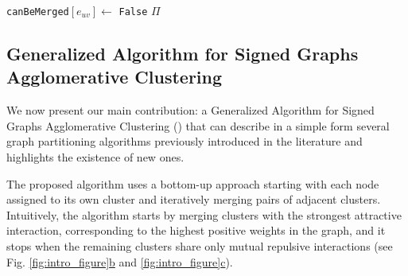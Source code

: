 \begin{algorithm}[t]
\begin{algorithmic}[1]
        \EndIf
          \State \texttt{canBeMerged}$[e_{uv}] \gets$ \texttt{False}
        \EndIf
      \EndWhile
      \State
      \Return $\Pi$



  \end{algorithmic}
  \label{main_alg}
\end{algorithm}


\subsection{Generalized Algorithm for Signed Graphs Agglomerative Clustering} \label{sec:algorithm}

We now present our main contribution: a Generalized Algorithm for Signed Graphs Agglomerative Clustering (\algname) that can describe in a simple form several graph partitioning algorithms previously introduced in the literature and highlights the existence of new ones.

The proposed algorithm uses a bottom-up approach starting with each node assigned to its own cluster and iteratively merging pairs of adjacent clusters. Intuitively, the algorithm starts by merging clusters with the strongest attractive interaction, corresponding to the highest positive weights in the graph, and it stops when the remaining clusters share only mutual repulsive interactions (see Fig. \hyperref[fig:intro_figure]{\ref*{fig:intro_figure}b} and \hyperref[fig:intro_figure]{\ref*{fig:intro_figure}c}). 

